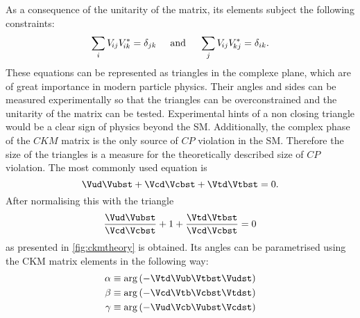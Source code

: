 As a consequence of the unitarity of the matrix, its elements subject the following constraints:
\begin{equation}
\sum_{i} V_{{\kern -0.1em}ij}V_{{\kern -0.1em}ik}^{*} = \delta_{jk}\hspace{0.5cm}\text{and}\hspace{0.5cm}
\sum_{j} V_{{\kern -0.1em}ij}V_{{\kern -0.1em}kj}^{*} = \delta_{ik}.
\end{equation}
These equations can be represented as triangles in the complexe plane, which are of great importance in modern particle physics.
Their angles and sides can be measured experimentally so that the triangles can be overconstrained and the unitarity of the matrix can be tested.
Experimental hints of a non closing triangle would be a clear sign of physics beyond the \ac{SM}.
Additionally, the complex phase of the $CKM$ matrix is the only source of $CP$ violation in the \ac{SM}.
Therefore the size of the triangles is a measure for the theoretically described size of $CP$ violation.
The most commonly used equation is
\begin{equation}
\Vud\Vubst + \Vcd\Vcbst + \Vtd\Vtbst = 0.
\end{equation}
After normalising this with \Vcd\Vcbst the triangle
\begin{equation}
\frac{\Vud\Vubst}{\Vcd\Vcbst} + 1 + \frac{\Vtd\Vtbst}{\Vcd\Vcbst} = 0 \label{eq:CKMtriangle}
\end{equation}
as presented in \cref{fig:ckmtheory} is obtained.
Its angles can be parametrised using the CKM matrix elements in the following way:
\begin{equation}
\begin{aligned}
\alpha&\equiv\arg\left(-\Vtd\Vub\Vtbst\Vudst\right)\\
\beta&\equiv\arg\left(-\Vcd\Vtb\Vcbst\Vtdst\right)\\
\gamma&\equiv\arg\left(-\Vud\Vcb\Vubst\Vcdst\right)\label{eq:CKMangles}
\end{aligned}
\end{equation}
